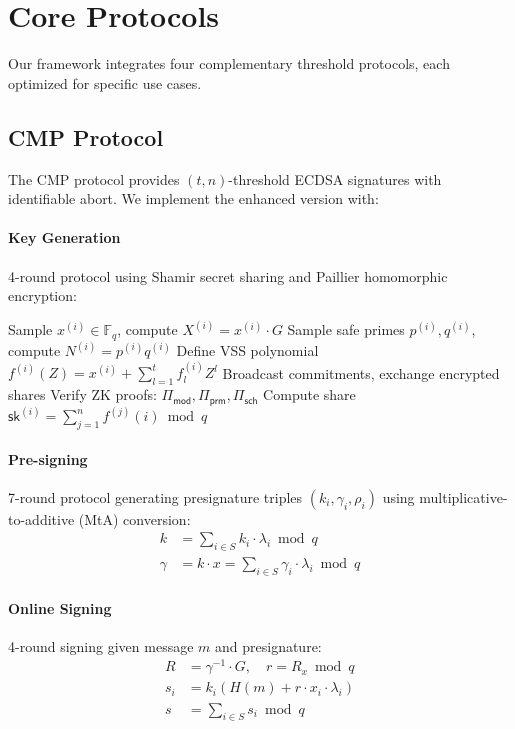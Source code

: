 \section{Core Protocols}


Our framework integrates four complementary threshold protocols, each optimized for specific use cases.

\subsection{CMP Protocol}

The CMP protocol \cite{canetti2021} provides $(t,n)$-threshold ECDSA signatures with identifiable abort. We implement the enhanced version with:

\paragraph{Key Generation} 4-round protocol using Shamir secret sharing and Paillier homomorphic encryption:
\begin{algorithmic}[1]
\State Sample $x^{(i)} \in \mathbb{F}_q$, compute $X^{(i)} = x^{(i)} \cdot G$
\State Sample safe primes $p^{(i)}, q^{(i)}$, compute $N^{(i)} = p^{(i)} q^{(i)}$
\State Define VSS polynomial $f^{(i)}(Z) = x^{(i)} + \sum_{l=1}^t f^{(i)}_l Z^l$
\State Broadcast commitments, exchange encrypted shares
\State Verify ZK proofs: $\Pi_{\textsf{mod}}, \Pi_{\textsf{prm}}, \Pi_{\textsf{sch}}$
\State Compute share $\textsf{sk}^{(i)} = \sum_{j=1}^n f^{(j)}(i) \bmod q$
\end{algorithmic}

\paragraph{Pre-signing} 7-round protocol generating presignature triples $(k_i, \gamma_i, \rho_i)$ using multiplicative-to-additive (MtA) conversion:
\begin{align*}
k &= \sum_{i \in S} k_i \cdot \lambda_i \bmod q \\
\gamma &= k \cdot x = \sum_{i \in S} \gamma_i \cdot \lambda_i \bmod q
\end{align*}

\paragraph{Online Signing} 4-round signing given message $m$ and presignature:
\begin{align*}
R &= \gamma^{-1} \cdot G, \quad r = R_x \bmod q \\
s_i &= k_i (H(m) + r \cdot x_i \cdot \lambda_i) \\
s &= \sum_{i \in S} s_i \bmod q
\end{align*}

